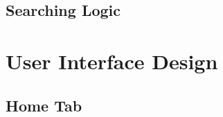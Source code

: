 
\subsection{Searching Logic} %
\label{sub:searching_logic}

\newpage
\section{User Interface Design} %
\label{sec:user_interface_design}

\subsection{Home Tab} %
\label{sub:tabs}



